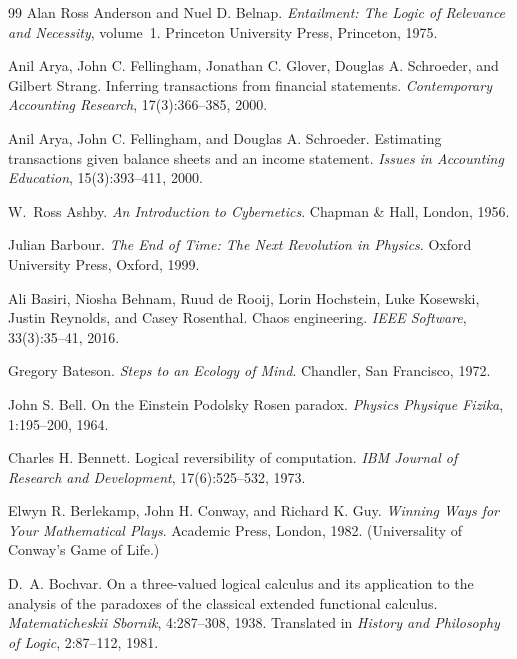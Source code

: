 \documentclass[11pt,a4paper]{article}
\theoremstyle{remark}\newtheorem{remark}[definition]{Remark}
\begin{document}
\begin{thebibliography}{99}
Alan Ross Anderson and Nuel D. Belnap.
\newblock \emph{Entailment: The Logic of Relevance and Necessity}, volume~1.
\newblock Princeton University Press, Princeton, 1975.

Anil Arya, John C. Fellingham, Jonathan C. Glover, Douglas A. Schroeder, and Gilbert Strang.
\newblock Inferring transactions from financial statements.
\newblock \emph{Contemporary Accounting Research}, 17(3):366--385, 2000.

Anil Arya, John C. Fellingham, and Douglas A. Schroeder.
\newblock Estimating transactions given balance sheets and an income statement.
\newblock \emph{Issues in Accounting Education}, 15(3):393--411, 2000.

W.~Ross Ashby.
\newblock \emph{An Introduction to Cybernetics}.
\newblock Chapman \& Hall, London, 1956.

Julian Barbour.
\newblock \emph{The End of Time: The Next Revolution in Physics}.
\newblock Oxford University Press, Oxford, 1999.

Ali Basiri, Niosha Behnam, Ruud de Rooij, Lorin Hochstein, Luke Kosewski, Justin Reynolds, and Casey Rosenthal.
\newblock Chaos engineering.
\newblock \emph{IEEE Software}, 33(3):35--41, 2016.

Gregory Bateson.
\newblock \emph{Steps to an Ecology of Mind}.
\newblock Chandler, San Francisco, 1972.

John S. Bell.
\newblock On the Einstein Podolsky Rosen paradox.
\newblock \emph{Physics Physique Fizika}, 1:195--200, 1964.

Charles H. Bennett.
\newblock Logical reversibility of computation.
\newblock \emph{IBM Journal of Research and Development}, 17(6):525--532, 1973.

Elwyn R. Berlekamp, John H. Conway, and Richard K. Guy.
\newblock \emph{Winning Ways for Your Mathematical Plays}.
\newblock Academic Press, London, 1982.
\newblock (Universality of Conway's Game of Life.)

D.~A. Bochvar.
\newblock On a three-valued logical calculus and its application to the analysis of the paradoxes of the classical extended functional calculus.
\newblock \emph{Matematicheskii Sbornik}, 4:287--308, 1938. Translated in \emph{History and Philosophy of Logic}, 2:87--112, 1981.


\end{thebibliography}
\end{document}

